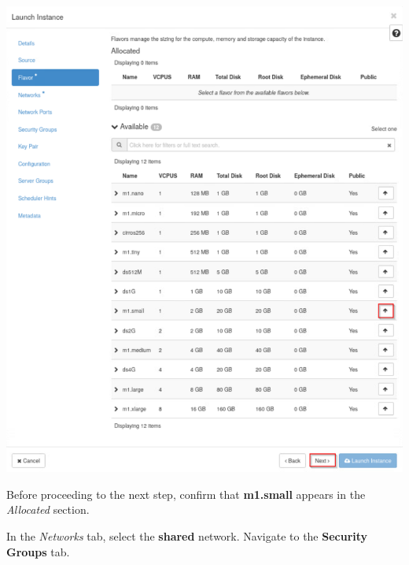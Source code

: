 \documentclass[letterpaper, 12pt]{article}
\begin{document}
\begin{enumerate}
\begin{labstep}
        \begin{center}
            \includegraphics[width=\linewidth]{images/part6/step13.png}
        \end{center}
    \end{labstep}

    \begin{stopbox}
        Before proceeding to the next step, confirm that \textbf{m1.small} appears in the \textit{Allocated} section.
    \end{stopbox}

    \begin{labstep}
        In the \textit{Networks} tab, select the \textbf{shared} network.
        Navigate to the \textbf{Security Groups} tab.


\end{labstep}
\end{enumerate}
\end{document}
